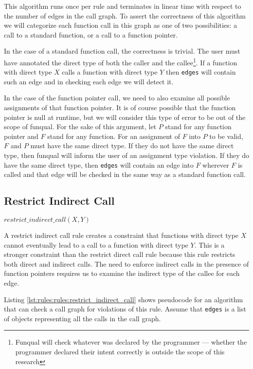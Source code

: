 This algorithm runs once per rule and terminates in linear time with respect to the number of edges in the call graph.  To assert the correctness of this algorithm we will categorize each function call in this graph as one of two possibilities:  a call to a standard function, or a call to a function pointer.

In the case of a standard function call, the correctness is trivial.  The user must have annotated the direct type of both the caller and the callee\footnote{Funqual will check whatever was declared by the programmer --- whether the programmer declared their intent correctly is outside the scope of this research}.  If a function with direct type $X$ calls a function with direct type $Y$ then \lstinline{edges} will contain such an edge and in checking each edge we will detect it.  

In the case of the function pointer call, we need to also examine all possible assignments of that function pointer.  It is of course possible that the function pointer is null at runtime, but we will consider this type of error to be out of the scope of funqual.  For the sake of this argument, let $P$ stand for any function pointer and $F$ stand for any function.  For an assignment of $F$ into $P$ to be valid, $F$ and $P$ must have the same direct type.  If they do not have the same direct type, then funqual will inform the user of an assignment type violation.  If they do have the same direct type, then \lstinline{edges} will contain an edge into $F$ wherever $F$ is called and that edge will be checked in the same way as a standard function call.  

\subsection{Restrict Indirect Call}

\begin{center}
    $restrict\_indirect\_call(X, Y)$
\end{center}

A restrict indirect call rule creates a constraint that functions with direct type $X$ cannot eventually lead to a call to a function with direct type $Y$.  This is a stronger constraint than the restrict direct call rule because this rule restricts both direct and indirect calls.  The need to enforce indirect calls in the presence of function pointers requires us to examine the indirect type of the callee for each edge.  

Listing \ref{lst:rules:rules:restrict_indirect_call} shows pseudocode for an algorithm that can check a call graph for violations of this rule.  Assume that \lstinline{edges} is a list of objects representing all the calls in the call graph.  

